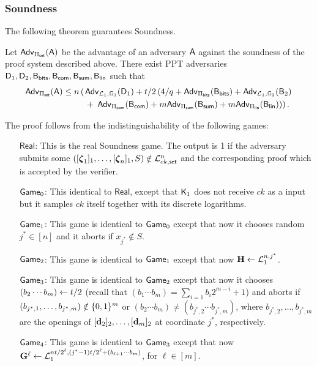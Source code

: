 \subsubsection{Soundness}

The following theorem guarantees Soundness. 
 
\begin{theorem} Let \(\mathsf{Adv}_{{\Pi_{\mathsf{set}}}}(\mathsf{A})\) 
be the advantage of an adversary \(\mathsf{A}\) against the soundness of 
the proof system  described above. There exist PPT adversaries
\(\mathsf{D}_1,\mathsf{D}_2,\mathsf{B}_{\mathsf{bits}},\mathsf{B}_{\mathsf{com}},\mathsf{B}_{\mathsf{sum}},\mathsf{B}_\mathsf{lin}\) such that 
\begin{align*}
\mathsf{Adv}_{{\Pi_{\mathsf{set}}}}(\mathsf{A}) \leq 
n \left(\right.
    &\mathsf{Adv}_{\mathcal{L}_1,\mathbb{G}_1}(\mathsf{D}_1) 
        + t /2\left(4/q
            +  \mathsf{Adv}_{\Pi_{\mathsf{bits}}}(\mathsf{B}_{\mathsf{bits}})
            +  \mathsf{Adv}_{\mathcal{L}_1,\mathbb{G}_2}(\mathsf{B}_2)\right. \\
    &+ \left.\left.\mathsf{Adv}_{{\Pi_{\mathsf{com}}}}(\mathsf{B}_{\mathsf{com}})
        + m\mathsf{Adv}_{{\Pi_{\mathsf{sum}}}}(\mathsf{B}_{\mathsf{sum}})
        + m\mathsf{Adv}_{{\Pi_\mathsf{lin}}}(\mathsf{B}_\mathsf{lin})\right)\right).
\end{align*}
\label{teo:bitstr-soundness}
\end{theorem}

The proof follows from the indistinguishability of the following games:
\begin{itemize}
\item[\(\mathsf{Real}\):] This is the real Soundness game. The output is 1 if the adversary submits some \(([{\boldsymbol \zeta}_1]_1,\ldots,[{\boldsymbol \zeta}_n]_1,S)\notin\mathcal{L}_{ck,\mathsf{set}}^n\) and the corresponding proof which is accepted by the verifier.
\item[\(\mathsf{Game}_0\):] This identical to \(\mathsf{Real}\), except that \(\mathsf{K}_1\) does not receive \(ck\) as a input but
it samples \(ck\) itself together with its discrete logarithms.
\item[\(\mathsf{Game}_1\):] This game is identical to \(\mathsf{Game}_0\) except that now it chooses random \(j^*\in[n]\) and it aborts if \(x_{j^*}\notin S\).
\item[\(\mathsf{Game}_2\):] This game is identical to \(\mathsf{Game}_1\) except that now \(\mathbf{{H}}\gets\mathcal{L}^{n,j^*}_1\).
\item[\(\mathsf{Game}_3\):] This game is identical to \(\mathsf{Game}_2\) except that now it chooses \((b_2\cdots b_m)\gets t /2\) (recall that \((b_1\cdots b_m)=\sum_{i=1}b_i2^{m-i}+1\)) and aborts if \((b_{j^*,1},\ldots,b_{j^*,m})\notin\{0,1\}^m\) or \((b_2\cdots b_m)\neq(b_{j^*,2}\cdots b_{j^*,m})\), where \(b_{j^*,2},\ldots,b_{j^*,m}\) are the openings of \([\mathbf{d}_2]_2,\ldots,[\mathbf{d}_m]_2\) at coordinate \(j^*\), respectively.
\item[\(\mathsf{Game}_4\):] This game is identical to \(\mathsf{Game}_3\) except that now \(\mathbf{{G}}^\ell\gets\mathcal{L}_1^{nt /2^\ell,(j^*-1)t /2^\ell+(b_{\ell+1}\cdots b_m)}\), for \(\ell\in [m]\).
\end{itemize}

